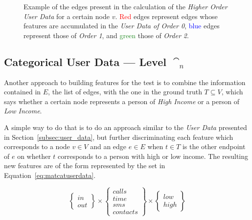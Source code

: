 
\begin{figure}
\centering
\framebox[\columnwidth]{%
	
}
\caption{Example of the edges present in the calculation of the \emph{Higher Order User Data} for a certain node $v$. \textcolor{red}{Red} edges represent edges whose features are accumulated in the \emph{User Data of Order 0}, \textcolor{blue}{blue} edges represent those of \emph{Order 1}, and \textcolor{ForestGreen}{green} those of \emph{Order 2}.}
\label{fig:higherorderuserdata}
\end{figure}

\subsection{Categorical User Data --- Level $\cat_n$}
\label{subsec:categoricaluserdata}

Another approach to building features for the test is to combine the information contained in $E$, the list of edges, with the one in the ground truth $T \subseteq V$, which says whether a certain node represents a person of \emph{High Income} or a person of \emph{Low Income}.

A simple way to do that is to do an approach similar to the \emph{User Data} presented in Section~\ref{subsec:user_data}, but further discriminating each feature which corresponds to a node $v \in V$ and an edge $e \in E$ when $t \in T$ is the other endpoint of $e$ on whether $t$ corresponds to a person with high or low income. The resulting new features are of the form represented by the set in Equation~\ref{eq:matcatuserdata}.

\begin{equation}
\begin{Bmatrix} in \\ out \end{Bmatrix}
\times
\begin{Bmatrix} calls \\ time \\ sms \\ contacts \end{Bmatrix}
\times
\begin{Bmatrix} low \\ high \end{Bmatrix}
\label{eq:matcatuserdata}
\end{equation}

